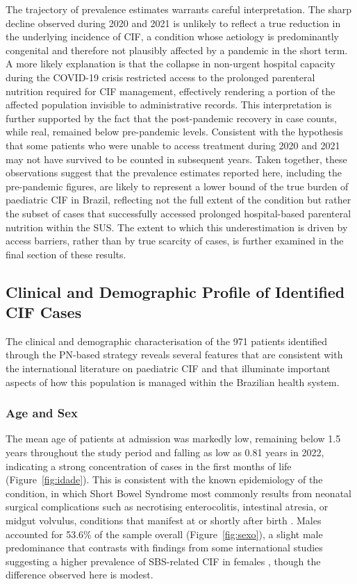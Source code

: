 \documentclass[pdflatex,sn-mathphys-num]{sn-jnl}
\theoremstyle{thmstyleone}%
\theoremstyle{thmstyletwo}%
\theoremstyle{thmstylethree}%
\begin{document}
The trajectory of prevalence estimates warrants careful interpretation. The sharp decline observed during 2020 and 2021 is unlikely to reflect a true reduction in the underlying incidence of CIF, a condition whose aetiology is predominantly congenital and therefore not plausibly affected by a pandemic in the short term. A more likely explanation is that the collapse in non-urgent hospital capacity during the COVID-19 crisis restricted access to the prolonged parenteral nutrition required for CIF management, effectively rendering a portion of the affected population invisible to administrative records. This interpretation is further supported by the fact that the post-pandemic recovery in case counts, while real, remained below pre-pandemic levels. Consistent with the hypothesis that some patients who were unable to access treatment during 2020 and 2021 may not have survived to be counted in subsequent years. Taken together, these observations suggest that the prevalence estimates reported here, including the pre-pandemic figures, are likely to represent a lower bound of the true burden of paediatric CIF in Brazil, reflecting not the full extent of the condition but rather the subset of cases that successfully accessed prolonged hospital-based parenteral nutrition within the SUS. The extent to which this underestimation is driven by access barriers, rather than by true scarcity of cases, is further examined in the final section of these results.

\subsection*{Clinical and Demographic Profile of Identified CIF Cases}

The clinical and demographic characterisation of the 971 patients identified through the PN-based strategy reveals several features that are consistent with the international literature on paediatric CIF and that illuminate important aspects of how this population is managed within the Brazilian health system.

\subsubsection*{Age and Sex}

The mean age of patients at admission was markedly low, remaining below 1.5 years throughout the study period and falling as low as 0.81 years in 2022, indicating a strong concentration of cases in the first months of life (Figure~\ref{fig:idade}). This is consistent with the known epidemiology of the condition, in which Short Bowel Syndrome most commonly results from neonatal surgical complications such as necrotising enterocolitis, intestinal atresia, or midgut volvulus, conditions that manifest at or shortly after birth \cite{wales2004neonatal, squires2012natural}. Males accounted for 53.6\% of the sample overall (Figure~\ref{fig:sexo}), a slight male predominance that contrasts with findings from some international studies suggesting a higher prevalence of SBS-related CIF in females \cite{massironi2020understanding}, though the difference observed here is modest.
\end{document}
